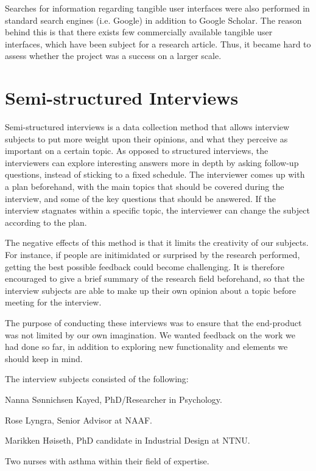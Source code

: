 Searches for information regarding tangible user interfaces were also performed in standard search engines (i.e. Google) in addition to Google Scholar. The reason behind this is that there exists few commercially available tangible user interfaces, which have been subject for a research article. Thus, it became hard to assess whether the project was a success on a larger scale. 
 
\section{Semi-structured Interviews}
\label{sec:semistructuredinterviews}

Semi-structured interviews is a data collection method that allows interview subjects to put more weight upon their opinions, and what they perceive as important on a certain topic. As opposed to structured interviews, the interviewers can explore interesting answers more in depth by asking follow-up questions, instead of sticking to a fixed schedule. The interviewer comes up with a plan beforehand, with the main topics that should be covered during the interview, and some of the key questions that should be answered. If the interview stagnates within a specific topic, the interviewer can change the subject according to the plan.

The negative effects of this method is that it limits the creativity of our subjects. For instance, if people are initimidated or surprised by the research performed, getting the best possible feedback could become challenging. It is therefore encouraged to give a brief summary of the research field beforehand, so that the interview subjects are able to make up their own opinion about a topic before meeting for the interview\cite{harrell2009data}.

The purpose of conducting these interviews was to ensure that the end-product was not limited by our own imagination. We wanted feedback on the work we had done so far, in addition to exploring new functionality and elements we should keep in mind.

The interview subjects consisted of the following: 

Nanna S\o nnichsen Kayed, PhD/Researcher in Psychology.

Rose Lyngra, Senior Advisor at NAAF.

Marikken H\o iseth, PhD candidate in Industrial Design at NTNU. 

Two nurses with asthma within their field of expertise.

